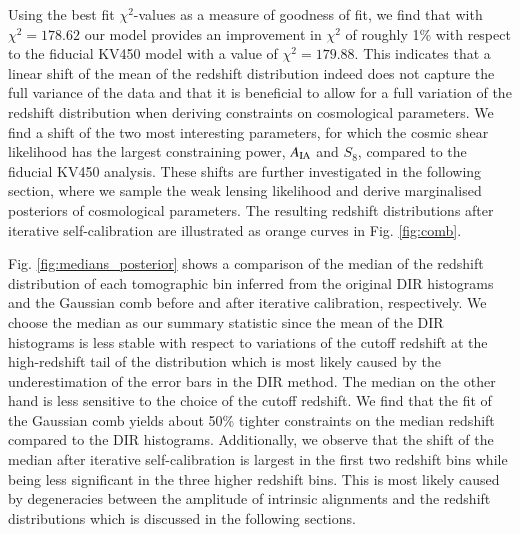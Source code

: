\documentclass{aa}
\begin{document}
Using the best fit $\chi^2$-values as a measure of goodness of fit, we find that with $\chi^2 = 178.62$ our model provides an improvement in $\chi^2$ of roughly 1\% with respect to the fiducial KV450 model with a value of $\chi^2 = 179.88$. This indicates that a linear shift of the mean of the redshift distribution indeed does not capture the full variance of the data and that it is beneficial to allow for a full variation of the redshift distribution when deriving constraints on cosmological parameters. We find a shift of the two most interesting parameters, for which the cosmic shear likelihood has the largest constraining power, $A_{\rm IA}$ and $S_8$, compared to the fiducial KV450 analysis. These shifts are further investigated in the following section, where we sample the weak lensing likelihood and derive marginalised posteriors of cosmological parameters. The resulting redshift distributions after iterative self-calibration are illustrated as orange curves in Fig. \ref{fig:comb}. 

Fig. \ref{fig:medians_posterior} shows a comparison of the median of the redshift distribution of each tomographic bin inferred from the original DIR histograms and the Gaussian comb before and after iterative calibration, respectively. We choose the median as our summary statistic since the mean of the DIR histograms is less stable with respect to variations of the cutoff redshift at the high-redshift tail of the distribution which is most likely caused by the underestimation of the error bars in the DIR method. The median on the other hand is less sensitive to the choice of the cutoff redshift. We find that the fit of the Gaussian comb yields about 50\% tighter constraints on the median redshift compared to the DIR histograms. Additionally, we observe that the shift of the median after iterative self-calibration is largest in the first two redshift bins while being less significant in the three higher redshift bins. This is most likely caused by degeneracies between the amplitude of intrinsic alignments and the redshift distributions which is discussed in the following sections. 
\end{document}
